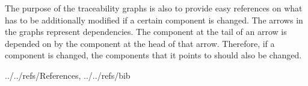 \documentclass[12pt]{article}
\begin{document}
The purpose of the traceability graphs is also to provide easy references on
what has to be additionally modified if a certain component is changed.  The
arrows in the graphs represent dependencies. The component at the tail of an
arrow is depended on by the component at the head of that arrow. Therefore, if a
component is changed, the components that it points to should also be changed.










\newpage

 {../../refs/References, ../../refs/bib}

\end{document}
